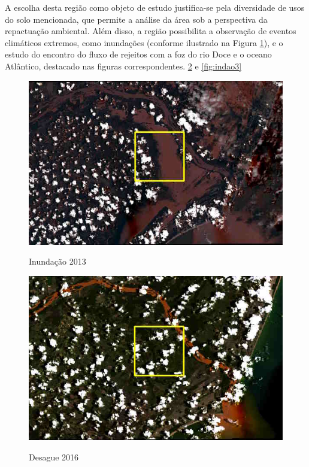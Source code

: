 	  \hspace*{1.25 cm} A escolha desta região como objeto de estudo justifica-se pela diversidade de usos do solo mencionada, que permite a análise da área sob a perspectiva da repactuação ambiental. Além disso, a região possibilita a observação de eventos climáticos extremos, como inundações (conforme ilustrado na Figura \ref{fig:indao}), e o estudo do encontro do fluxo de rejeitos com a foz do rio Doce e o oceano Atlântico, destacado nas figuras correspondentes. \ref{fig:indao2} e \ref{fig:indao3}\\  
				\begin{minipage}[t!]{0.33\textwidth}
					\begin{figure}[H]
						\centering \small \caption{Inundação 2013}
						\includegraphics[width=0.97\linewidth]{FIGURAS/enche}
						\label{fig:indao} 
					\end{figure}			
				\end{minipage}\hfill
				\begin{minipage}[t!]{0.33\textwidth}
					\begin{figure}[H]
						\centering \small \caption{Desague 2016}
						\includegraphics[width=0.97\linewidth]{FIGURAS/lamache1}
						\label{fig:indao2} 
					\end{figure}					
				\end{minipage} 
